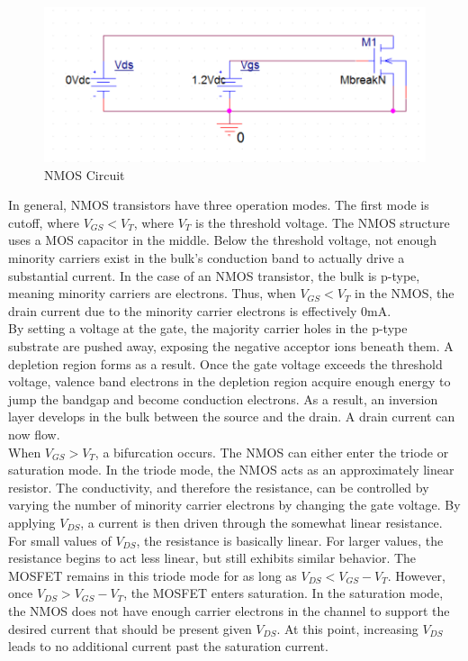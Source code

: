 \FloatBarrier

\begin{figure}[h!]
	\centering
	\includegraphics[scale=0.5]{./images/circuit1.PNG}
	\caption{NMOS Circuit}
	\label{fig:circuit1}
\end{figure}

\FloatBarrier

In general, NMOS transistors have three operation modes. The first mode is cutoff, where $V_{GS} < V_{T}$, where $V_{T}$ is the threshold voltage. The NMOS structure uses a MOS capacitor in the middle. Below the threshold voltage, not enough minority carriers exist in the bulk's conduction band to actually drive a substantial current. In the case of an NMOS transistor, the bulk is p-type, meaning minority carriers are electrons. Thus, when $V_{GS} < V_{T}$ in the NMOS, the drain current due to the minority carrier electrons is effectively $0$\si{\milli\ampere}. \\

By setting a voltage at the gate, the majority carrier holes in the p-type substrate are pushed away, exposing the negative acceptor ions beneath them. A depletion region forms as a result. Once the gate voltage exceeds the threshold voltage, valence band electrons in the depletion region acquire enough energy to jump the bandgap and become conduction electrons. As a result, an inversion layer develops in the bulk between the source and the drain. A drain current can now flow. \\

When $V_{GS} > V_{T}$, a bifurcation occurs. The NMOS can either enter the triode or saturation mode. In the triode mode, the NMOS acts as an approximately linear resistor. The conductivity, and therefore the resistance, can be controlled by varying the number of minority carrier electrons by changing the gate voltage. By applying $V_{DS}$, a current is then driven through the somewhat linear resistance. For small values of $V_{DS}$, the resistance is basically linear. For larger values, the resistance begins to act less linear, but still exhibits similar behavior. The MOSFET remains in this triode mode for as long as $V_{DS} < V_{GS} - V_{T}$. However, once $V_{DS} > V_{GS} - V_{T}$, the MOSFET enters saturation. In the saturation mode, the NMOS does not have enough carrier electrons in the channel to support the desired current that should be present given $V_{DS}$. At this point, increasing $V_{DS}$ leads to no additional current past the saturation current.

